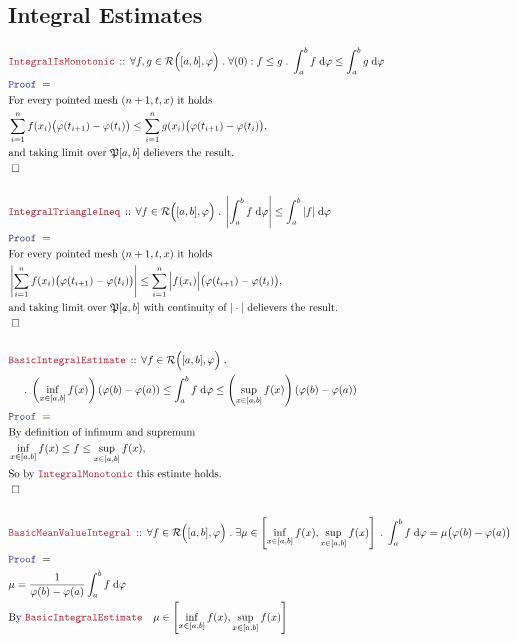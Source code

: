 \documentclass[12pt]{scrartcl}
\newcommand{\LOGIC}[1]{\textcolor{Blue}{\mathtt{#1}}}
\newcommand{\THM}[1]{\textcolor{Maroon}{\mathtt{#1}}}
\renewcommand{\.}{\; . \;}
\newcommand{\Theorem}[2]{& \THM{#1} \, :: \, #2 \\ & \Proof = \\ }
\newcommand{\NewLine}{\\ & \kern 1pc}
\newcommand{\Page}[1]{ \begin{align*} #1 \end{align*}   }
\newcommand{\QED}{\; \square}
\newcommand{\EndProof}{& \QED \\}
\newcommand{\Proof}{\LOGIC{Proof} \; }
\begin{document}
\subsection{Integral Estimates }
\Page{
	\Theorem{IntegralIsMonotonic}{\forall f,g \in \mathcal{R}\Big([a,b], \varphi \Big)  \. \forall (0) : f \le g \. 
		\int^b_a f \; \mathrm{d}\varphi \le \int^b_a g \; \mathrm{d}\varphi 
	}
	& \text{For every pointed mesh $(n+1,t,x)$  it holds} \\
	& \sum^n_{i=1} f(x_i)\big( \varphi(t_{i+1}) - \varphi(t_i) \big) \le 
		\sum^n_{i=1} g(x_i)\big( \varphi(t_{i+1})- \varphi(t_i) \big), \\
	& \text{and taking limit over $\mathfrak{P}[a,b]$ delievers the result.} \\
	\EndProof
	\\
	\Theorem{IntegralTriangleIneq}{\forall f \in \mathcal{R}\Big([a,b],\varphi\Big)  \.
		\left| \int^b_a f \; \mathrm{d}\varphi \right| \le \int^b_a |f| \; \mathrm{d} \varphi
	}
	& \text{For every pointed mesh $(n+1,t,x)$  it holds} \\
	& \left|\sum^n_{i=1} f(x_i)\big( \varphi(t_{i+1}) - \varphi(t_i) \big) \right| \le 
		\sum^n_{i=1} \Big|f(x_i)\Big|\big( \varphi(t_{i+1})- \varphi(t_i) \big), \\
	& \text{and taking limit over $\mathfrak{P}[a,b]$ with continuity of $|\cdot|$ delievers the result.} \\
	\EndProof
	\\
	\Theorem{BasicIntegralEstimate}{\forall f \in \mathcal{R}\Big([a,b],\varphi\Big) \. 
		\NewLine \.
		\left(\inf_{x \in [a,b]} f(x) \right)(\varphi(b) - \varphi(a)) \le \int^b_a f \; \mathrm{d}\varphi \le 
		\left(\sup_{x \in [a,b]} f(x)\right)(\varphi(b) - \varphi(a))
	}
	& \text{By definition of infimum and supremum} \\
	& \inf_{x \in [a,b]} f(x) \le f \le \sup_{x \in [a,b]} f(x), \\
	& \text{So by $\THM{IntegralMonotonic}$ this estimte holds. } \\
	\EndProof
	\\
	\Theorem{BasicMeanValueIntegral}{\forall f \in \mathcal{R}\Big([a,b],\varphi\Big) \. 
	 \exists \mu \in \left[ \inf_{x \in [a,b]} f(x), \sup_{x \in [a,b]} f(x) \right] \. 
	 \int^b_a f \; \mathrm{d}\varphi = \mu\big( \varphi(b) - \varphi(a) \big) 
	}
	&  \mu = \frac{1}{\varphi(b) -\varphi(a)} \int^b_a f \; \mathrm{d}\varphi \\
	& \text{By  $\THM{BasicIntegralEstimate} \quad \mu \in 
		\left[ \inf_{x \in [a,b]} f(x),\sup_{x \in [a,b]} f(x) \right]$} \\
}
\end{document}
